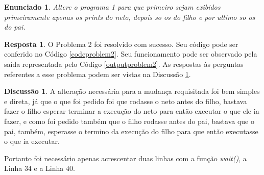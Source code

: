\documentclass[a4paper, 8pt]{article}
\theoremstyle{plain}
\newtheorem{statement}{Enunciado}
\theoremstyle{plain}
\theoremstyle{definition}
\newtheorem{discussion}{Discussão}
\theoremstyle{definition}
\newtheorem{answer}{Resposta}
\begin{document}
\begin{multicols}{2}
\begin{statement}
Altere o programa 1 para que primeiro sejam exibidos primeiramente apenas os prints do neto, depois so os do filho e por ultimo so os do pai.
\end{statement}

\begin{answer}
O Problema 2 foi resolvido com sucesso. Seu código pode ser conferido no Código \ref{codeproblem2}. Seu funcionamento pode ser observado pela saída representada pelo Código \ref{outputproblem2}. As respostas às perguntas referentes a esse problema podem ser vistas na Discussão \ref{dicussionproblem2}.
\end{answer}

%
%

\begin{discussion}
\label{dicussionproblem2}
A alteração necessária para a mudança requisitada foi bem simples e direta, já que o que foi pedido foi que rodasse o neto antes do filho, bastava fazer o filho esperar terminar a execução do neto para então executar o que ele ia fazer, e como foi pedido também que o filho rodasse antes do pai, bastava que o pai, também, esperasse o termino da execução do filho para que então executasse o que ia executar.

Portanto foi necessário apenas acrescentar duas linhas com a função \textit{wait()}, a Linha $34$ e a Linha $40$.
\end{discussion}


\end{multicols}
\end{document}
